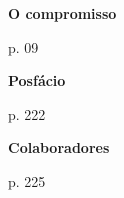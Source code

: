 \thispagestyle{empty}


\begin{vplace}
\begin{centering}
\textbf{O compromisso}

\medskip

p. 09

\medskip

\textbf{Posfácio}

\medskip

p. 222

\medskip

\textbf{Colaboradores}

\medskip

p. 225

\end{centering}
\end{vplace}
